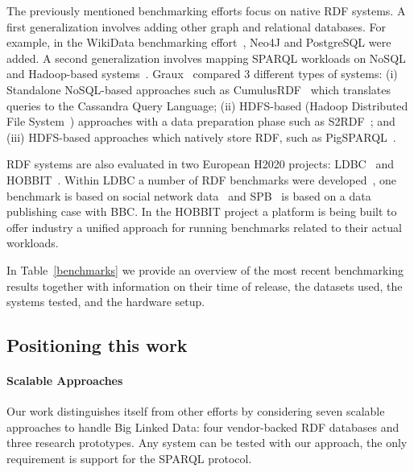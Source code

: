 \documentclass[twocolumn]{bmcart}%
\newcommand\todo[1]{\textcolor{red}{#1}}
\begin{document}
The previously mentioned benchmarking efforts focus on native RDF systems. A first generalization involves adding other graph and relational databases. For example, in the WikiData benchmarking effort~\cite{hernandez2016querying}, Neo4J and PostgreSQL were added. 
A second generalization involves mapping SPARQL workloads on NoSQL and Hadoop-based systems~\cite{cudre2013nosql, graux2016multi, Schatzle:2016:SRQ:2977797.2977806}. Graux~\cite{graux2016multi} compared 3 different types of systems: (i) Standalone NoSQL-based approaches such as CumulusRDF~\cite{ladwig2011cumulusrdf} which translates queries to the Cassandra Query Language; (ii) HDFS-based (Hadoop Distributed File System~\cite{ghemawat2003google}) approaches with a data preparation phase such as S2RDF~\cite{Schatzle:2016:SRQ:2977797.2977806}; and (iii) HDFS-based approaches which natively store RDF, such as PigSPARQL~\cite{schatzle2011pigsparql}. 

RDF systems are also evaluated in two European H2020 projects: LDBC~\cite{LDBC} and 
HOBBIT~\cite{HOBBIT}. Within LDBC a number of RDF benchmarks were developed~\cite{Boncz:2013:LBG:2513591.2527070}, one benchmark is based on social network data~\cite{erling2015ldbc} and SPB~\cite{kotsevbenchmarking} is based on a data publishing case with BBC. 
In the HOBBIT project a platform is being built to offer industry a unified approach for running benchmarks related to their actual workloads.

In Table~\ref{benchmarks} we provide an overview of the most recent benchmarking results together with information on their time of release, the datasets used,
the systems tested, and the hardware setup.

\subsection{Positioning this work}


\paragraph{Scalable Approaches}
Our work distinguishes itself from other efforts by considering seven scalable approaches to handle Big Linked Data: four vendor-backed RDF databases and three research prototypes. Any system can be tested with our approach, the only requirement is support for the SPARQL protocol.
\end{document}
